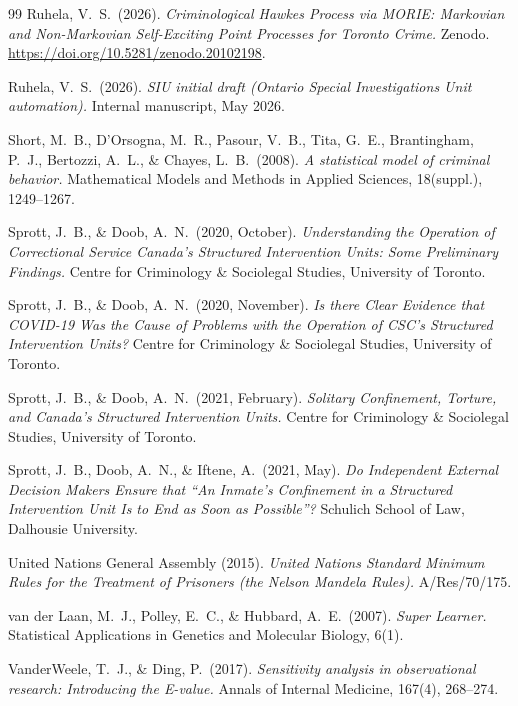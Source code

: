 \documentclass[11pt,a4paper]{article}
\theoremstyle{plain}
\theoremstyle{definition}
\theoremstyle{remark}
\begin{document}
\begin{thebibliography}{99}
Ruhela, V.\ S.\ (2026).
\emph{Criminological Hawkes Process via MORIE: Markovian and
Non-Markovian Self-Exciting Point Processes for Toronto Crime.}
Zenodo. \url{https://doi.org/10.5281/zenodo.20102198}.

Ruhela, V.\ S.\ (2026).
\emph{SIU initial draft (Ontario Special Investigations Unit
automation).}
Internal manuscript, May 2026.

Short, M.\ B., D'Orsogna, M.\ R., Pasour, V.\ B., Tita, G.\ E.,
Brantingham, P.\ J., Bertozzi, A.\ L., \& Chayes, L.\ B.\ (2008).
\emph{A statistical model of criminal behavior.}
Mathematical Models and Methods in Applied Sciences, 18(suppl.),
1249--1267.

Sprott, J.\ B., \& Doob, A.\ N.\ (2020, October).
\emph{Understanding the Operation of Correctional Service
Canada's Structured Intervention Units: Some Preliminary
Findings.}
Centre for Criminology \& Sociolegal Studies, University of
Toronto.

Sprott, J.\ B., \& Doob, A.\ N.\ (2020, November).
\emph{Is there Clear Evidence that COVID-19 Was the Cause of
Problems with the Operation of CSC's Structured Intervention
Units?}
Centre for Criminology \& Sociolegal Studies, University of
Toronto.

Sprott, J.\ B., \& Doob, A.\ N.\ (2021, February).
\emph{Solitary Confinement, Torture, and Canada's Structured
Intervention Units.}
Centre for Criminology \& Sociolegal Studies, University of
Toronto.

Sprott, J.\ B., Doob, A.\ N., \& Iftene, A.\ (2021, May).
\emph{Do Independent External Decision Makers Ensure that ``An
Inmate's Confinement in a Structured Intervention Unit Is to End
as Soon as Possible''?}
Schulich School of Law, Dalhousie University.

United Nations General Assembly (2015).
\emph{United Nations Standard Minimum Rules for the Treatment of
Prisoners (the Nelson Mandela Rules).}
A/Res/70/175.

van der Laan, M.\ J., Polley, E.\ C., \& Hubbard, A.\ E.\ (2007).
\emph{Super Learner.}
Statistical Applications in Genetics and Molecular Biology, 6(1).

VanderWeele, T.\ J., \& Ding, P.\ (2017).
\emph{Sensitivity analysis in observational research:
Introducing the E-value.}
Annals of Internal Medicine, 167(4), 268--274.


\end{thebibliography}
\end{document}
